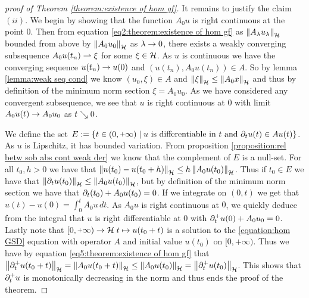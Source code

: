 \begin{proof}[proof of Theorem \ref{theorem:existence of hom gf}]
	It remains to justify the claim $ (ii) $.
	We begin by showing that the function $ A_0 u $ is right continuous
	at the point $ 0 $. Then from equation \eqref{eq2:theorem:existence of hom gf} 
	as $ \left\Vert A_\lambda u_\lambda\right\Vert_{\mathcal{H}}$ bounded from above  by $\left\Vert A_0 u_0\right\Vert_{\mathcal{H}} $
	as $ \lambda \rightarrow 0 $,
	there exists a weakly converging subsequence 
	$ A_0 u(t_n)\rightharpoonup \xi$ for some $\xi\in\mathcal{H} $.
	As $ u $ is continuous we have the converging sequence $ u(t_n)\rightarrow u(0) $
	and $ (u(t_n), A_0 u(t_n))\in A $. So
	by lemma \ref{lemma:weak seq cond} we know $ (u_0,\xi)\in A $
	and $ \left\Vert \xi\right\Vert_{\mathcal{H}}\leq \left\Vert A_0 x\right\Vert_{\mathcal{H}} $
	and thus by definition of the minimum norm section 
	$ \xi=A_0 u_0 $. As we have considered any convergent
	subsequence, we see that $ u $ is right continuous at $ 0 $
	with limit $ A_0 u(t)\rightarrow A_0 u_0 $ as $ t\searrow 0 $.\smallskip
	
	We define the set  
	$ E:=\{t\in(0,\plus\infty)\sep u\text{ is differentiable in }t\text{ and }
	\prt_t u(t)\in Au(t) \}$. As $ u $ is Lipschitz, it has bounded
	variation. From proposition 
	\ref{proposition:rel betw sob abs cont weak der} 
	we know that the complement of $ E $ is a null-set.
	For all $ t_0,h>0 $ we have that 
	$ \left\Vert u(t_0)-u(t_0+h)\right\Vert_{\mathcal{H}}\leq h\left\Vert A_0 u(t_0)\right\Vert_{\mathcal{H}} $. Thus if
	$ t_0\in E $ we have that $ \left\Vert \partial_t u(t_0)\right\Vert_{\mathcal{H}}\leq \left\Vert A_0 u(t_0)\right\Vert_{\mathcal{H}} $,
	but by definition of the minimum norm section we have that
	$ \partial_t (t_0)+A_0 u(t_0)=0 $. If we integrate on $ (0,t) $
	we get that $ u(t)-u(0)=\int_0^t A_0u\,dt $.
	As $ A_0 u $ is right continuous at $ 0 $, we quickly
	deduce from the integral that $ u $ is right differentiable
	at $ 0 $ with $ \partial_t^+ u(0)+A_0 u_0=0 $. Lastly 
	note that $ [0,\plus\infty)\ra\rH\;t\mapsto u(t_0+t) $
	is a solution to the \ref{equation:hom GSD} equation
	with operator $ A $ and initial value $ u(t_0) $
	on $ [0,\plus\infty) $. Thus we have 
	by equation \eqref{eq5:theorem:existence of hom gf} that
	$ \left\Vert \partial_t^+ u(t_0+t)\right\Vert_{\mathcal{H}}=\left\Vert A_0 u(t_0+t)\right\Vert_{\mathcal{H}}
	\leq \left\Vert A_0 u(t_0)\right\Vert_{\mathcal{H}}=\left\Vert \partial_t^+ u(t_0)\right\Vert_{\mathcal{H}} $.
	This shows that $ \partial_t^+ u $ is monotonically
	decreasing in the norm and thus ends
	the proof of the theorem.\smallskip
\end{proof}

